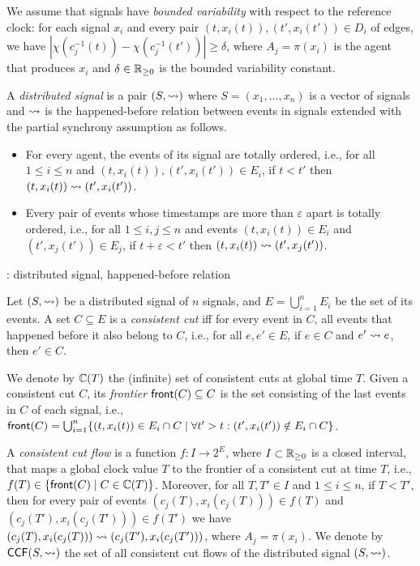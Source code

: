 We assume that signals have \emph{bounded variability} with respect to the reference clock: for each signal $x_i$ and every pair $(t, x_i(t)), (t', x_i(t')) \in D_i$ of edges, we have $|\chi(c_j^{-1}(t)) - \chi(c_j^{-1}(t'))| \geq \delta$, where $A_j = \pi(x_i)$ is the agent that produces $x_i$ and $\delta \in \mathbb{R}_{\geq 0}$ is the bounded variability constant.

\begin{definition}
	A \emph{distributed signal} is a pair $(S, {\rightsquigarrow})$ where $S = (x_1, \ldots, x_n)$ is a vector of signals and ${\rightsquigarrow}$ is the happened-before relation between events in signals extended with the partial synchrony assumption as follows.
	\begin{itemize}
		\item For every agent, the events of its signal are totally ordered, i.e., for all $1 \leq i \leq n$ and $(t, x_i(t)), (t', x_i(t')) \in E_i$, if $t < t'$ then $(t, x_i(t)) \rightsquigarrow (t', x_i(t'))$.
		\item Every pair of events whose timestamps are more than $\varepsilon$ apart is totally ordered, i.e., for all $1 \leq i,j \leq n$ and events $(t, x_i(t)) \in E_i$ and $(t', x_j(t')) \in E_j$, if $t + \varepsilon < t'$ then $(t, x_i(t)) \rightsquigarrow (t', x_j(t'))$. %
	\end{itemize}
\end{definition}

\begin{example}
	\TODO: distributed signal, happened-before relation
\end{example}

\begin{definition}
	Let $(S, {\rightsquigarrow})$ be a distributed signal of $n$ signals, and $E = \bigcup_{i = 1}^{n} E_i$ be the set of its events.
	A set $C \subseteq E$ is a \emph{consistent cut} iff for every event in $C$, all events that happened before  it also belong to $C$, i.e., for all $e, e' \in E$, if $e \in C$ and $e' \rightsquigarrow e$, then $e' \in C$.
\end{definition}

We denote by $\mathbb{C}(T)$ the (infinite) set of consistent cuts at global time $T$.
Given a consistent cut $C$, its \emph{frontier} $\mathsf{front}(C) \subseteq C$ is the set consisting of the last events in $C$ of each signal, i.e., $\fr(C) = \bigcup_{i = 1}^{n} \{ (t, x_i(t)) \in E_i \cap C \st \forall t' > t : (t', x_i(t')) \notin E_i \cap C \}$.

A \emph{consistent cut flow} is a function $f : I \to 2^E$, where $I \subset \mathbb{R}_{\geq 0}$ is a closed interval, that maps a global clock value $T$ to the frontier of a consistent cut at time $T$, i.e., $f(T) \in \{\fr(C) \st C \in \CC(T)\}$.
Moreover, for all $T,T' \in I$ and $1 \leq i \leq n$, if $T < T'$, then for every pair of events $(c_j(T), x_i(c_j(T))) \in f(T)$ and $(c_j(T'), x_i(c_j(T'))) \in f(T')$ we have $(c_j(T), x_i(c_j(T))) \rightsquigarrow (c_j(T'), x_i(c_j(T')))$, where $A_j = \pi(x_i)$.
We denote by $\mathsf{CCF}(S,{\rightsquigarrow})$ the set of all consistent cut flows of the distributed signal $(S,{\rightsquigarrow})$.

